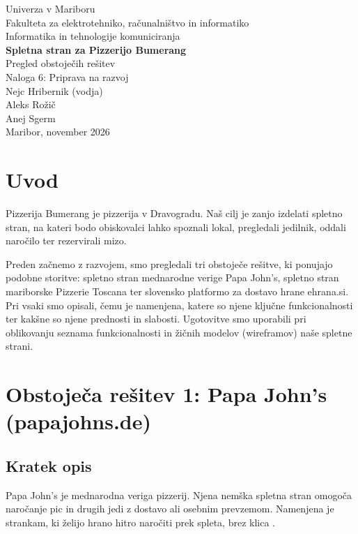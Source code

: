 \documentclass[12pt,a4paper]{article}
\begin{document}
\begin{titlepage}
  \centering
  {\large Univerza v Mariboru\\
   Fakulteta za elektrotehniko, računalništvo in informatiko\\[0.3cm]
   Informatika in tehnologije komuniciranja\\}
  \vfill
  {\Huge\bfseries Spletna stran za Pizzerijo Bumerang\\[0.4cm]}
  {\Large Pregled obstoječih rešitev\\[0.3cm]}
  {\large Naloga 6: Priprava na razvoj\\}
  \vfill
  {\large
   Nejc Hribernik (vodja)\\
   Aleks Rožič\\
   Anej Sgerm\\}
  \vfill
  {\large Maribor, november 2026}
\end{titlepage}

\tableofcontents
\newpage

\section{Uvod}

Pizzerija Bumerang je pizzerija v Dravogradu. Naš cilj je zanjo izdelati
spletno stran, na kateri bodo obiskovalci lahko spoznali lokal, pregledali
jedilnik, oddali naročilo ter rezervirali mizo.

Preden začnemo z razvojem, smo pregledali tri obstoječe rešitve, ki ponujajo
podobne storitve: spletno stran mednarodne verige Papa John's, spletno stran
mariborske Pizzerie Toscana ter slovensko platformo za dostavo hrane
ehrana.si. Pri vsaki smo opisali, čemu je namenjena, katere so njene ključne
funkcionalnosti ter kakšne so njene prednosti in slabosti. Ugotovitve smo
uporabili pri oblikovanju seznama funkcionalnosti in žičnih modelov
(wireframov) naše spletne strani.

\section{Obstoječa rešitev 1: Papa John's (papajohns.de)}

\subsection*{Kratek opis}
Papa John's je mednarodna veriga pizzerij. Njena nemška spletna stran omogoča
naročanje pic in drugih jedi z dostavo ali osebnim prevzemom. Namenjena je
strankam, ki želijo hrano hitro naročiti prek spleta, brez klica
\cite{papajohns}.
\end{document}
